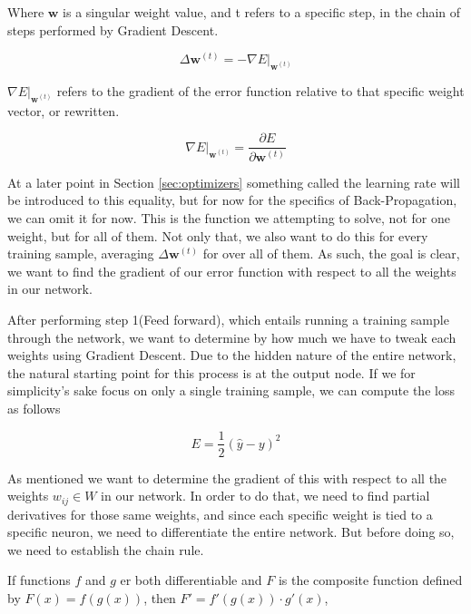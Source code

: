 Where $\mathbf{w}$ is a singular weight value, and t refers to a specific step,
in the chain of steps performed by Gradient Descent.

\begin{equation}
    \Delta \mathbf{w}^{(t)} = -\nabla E|_{\mathbf{w}^{(t)}}
\end{equation}

$\nabla E|_{\mathbf{w}^{(t)}}$ refers to the gradient of the
error function relative to that specific weight vector, or rewritten.

$$
\nabla E|_{\mathbf{w}^{(t)}} = \frac{\partial E}{\partial \mathbf{w}^{(t)}}
$$

At a later point in Section \ref{sec:optimizers} something called the learning
rate will be introduced to this equality, but for now for the specifics of
Back-Propagation, we can omit it for now. This is the function we attempting to
solve, not for one weight, but for all of them. Not only that, we also want to
do this for every training sample, averaging $\Delta \mathbf{w}^{(t)}$ for over all
of them. As such, the goal is clear, we want to find the gradient of our error
function with respect to all the weights in our network.

After performing step 1(Feed forward), which entails running a training sample
through the network, we want to determine by how much we have to tweak each
weights using Gradient Descent. Due to the hidden nature of the entire network,
the natural starting point for this process is at the output node. If we for
simplicity's sake focus on only a single training sample, we can compute the
loss as follows

$$
E = \frac{1}{2}(\hat{y} - y)^2
$$

As mentioned we want to determine the gradient of this with respect to all the
weights $w_{ij} \in W$ in our network. In order to do that, we need to find
partial derivatives for those same weights, and since each specific weight is
tied to a specific neuron, we need to differentiate the entire network. But
before doing so, we need to establish the chain rule.

\begin{lemma}
\label{lemma:chainrule}

    If functions $f$ and $g$ er both differentiable and $F$ is the composite
    function defined by $F(x) = f(g(x))$, then $F' = f'(g(x)) \cdot g'(x)$,

\end{lemma}

